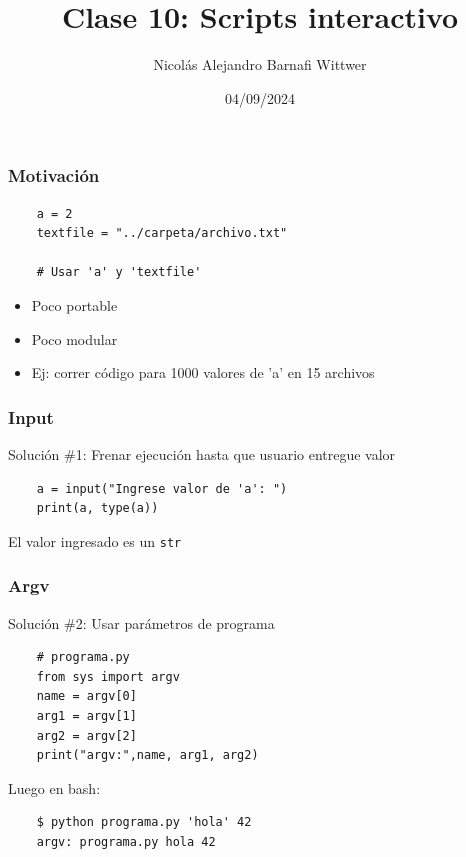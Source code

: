 \documentclass[14pt,aspectratio=169,xcolor=dvipsnames]{beamer}
\title[short title]{Clase 10: Scripts interactivo}
\subtitle{}
\author[NA Barnafi] {Nicolás Alejandro Barnafi Wittwer}
\institute[UC|CMM] 
{
    Pontificia Universidad Católica de Chile \\
    Centro de Modelamiento Matemático
}
\date{04/09/2024}
\newcommand{\code}[1]{{\color{purple}\tt#1}}
\begin{document}
\begin{frame}
    \maketitle
\end{frame}
\begin{frame}[fragile]\frametitle{Motivación}
    \begin{verbatim}
    a = 2
    textfile = "../carpeta/archivo.txt"
    
    # Usar 'a' y 'textfile'
    \end{verbatim}
    \begin{itemize}
        \item Poco portable
        \item Poco modular
        \item Ej: correr código para 1000 valores de 'a' en 15 archivos
    \end{itemize}

\pause {}
\end{frame}
\begin{frame}[fragile]\frametitle{Input}
    Solución \#1: Frenar ejecución hasta que usuario entregue valor
    
    \begin{verbatim}
    a = input("Ingrese valor de 'a': ")
    print(a, type(a))
    \end{verbatim}

    \vspace{1cm}
    El valor ingresado es un \code{str}
\end{frame}
\begin{frame}[fragile]\frametitle{Argv}
    Solución \#2: Usar parámetros de programa
    \begin{verbatim}
    # programa.py
    from sys import argv
    name = argv[0]
    arg1 = argv[1]
    arg2 = argv[2]
    print("argv:",name, arg1, arg2)
    \end{verbatim}

    Luego en bash:
    \begin{verbatim}
    $ python programa.py 'hola' 42
    argv: programa.py hola 42
    \end{verbatim}
\end{frame}
\end{document}
